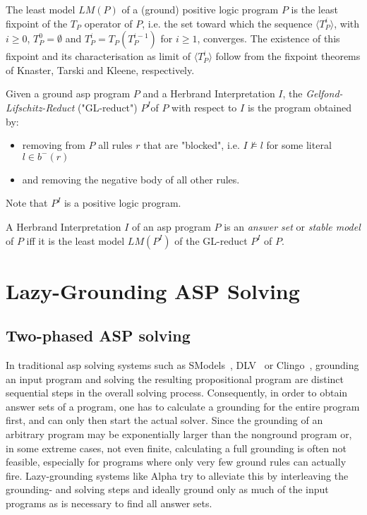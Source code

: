 \begin{definition}
\label{def:prelims-asp-semantics-least-model}
The least model $LM(P)$ of a (ground) positive logic program $P$ is the least fixpoint of the $T_P$ operator  of $P$, i.e. the set toward which the sequence $\langle T^{i}_{P} \rangle$, with $i \geq 0$, $T^{0}_P = \emptyset$ and $T^{i}_P = T_P(T^{i-1}_P)$ for $i \geq 1$, converges. The existence of this fixpoint and its characterisation as limit of $\langle T^{i}_{P} \rangle$ follow from the fixpoint theorems of Knaster, Tarski and Kleene, respectively.
\end{definition}

\begin{definition}
\label{def:prelims-asp-semantics-gl-reduct}
Given a ground \gls{asp} program $P$ and a Herbrand Interpretation $I$, the \emph{Gelfond-Lifschitz-Reduct} ("GL-reduct") $P^{I}$of $P$ with respect to $I$ is the program obtained by:
\begin{itemize}
	\item removing from $P$ all rules $r$ that are "blocked", i.e. $I \not\models l$ for some literal $l \in b^{-}(r)$ 
	\item and removing the negative body of all other rules.
\end{itemize}
Note that $P^{I}$ is a positive logic program.
\end{definition}

\begin{definition}
\label{def:prelims-asp-semantics-answer-set}
A Herbrand Interpretation $I$ of an \gls{asp} program $P$ is an \emph{answer set} or \emph{stable model} of $P$ iff it is the least model $LM(P^I)$ of the GL-reduct $P^I$ of $P$.
\end{definition}

\section{Lazy-Grounding ASP Solving}

\subsection{Two-phased ASP solving}
In traditional \gls{asp} solving systems such as SModels~\cite{smodels}, DLV~\cite{dlv} or Clingo~\cite{clingo}, grounding an input program and solving the resulting propositional program are distinct sequential steps in the overall solving process. Consequently, in order to obtain answer sets of a program, one has to calculate a grounding for the entire program first, and can only then start the actual solver. Since the grounding of an arbitrary program may be exponentially larger than the nonground program or, in some extreme cases, not even finite, calculating a full grounding is often not feasible, especially for programs where only very few ground rules can actually fire. Lazy-grounding systems like Alpha try to alleviate this by interleaving the grounding- and solving steps and ideally ground only as much of the input programs as is necessary to find all answer sets.

